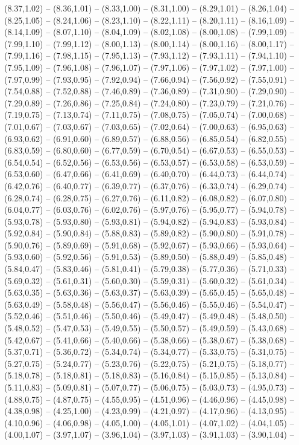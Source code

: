 {(8.37,1.02) -- (8.36,1.01) -- (8.33,1.00) -- (8.31,1.00) -- (8.29,1.01) -- (8.26,1.04) -- (8.25,1.05) -- (8.24,1.06) -- (8.23,1.10) -- (8.22,1.11) -- (8.20,1.11) -- (8.16,1.09) -- (8.14,1.09) -- (8.07,1.10) -- (8.04,1.09) -- (8.02,1.08) -- (8.00,1.08) -- (7.99,1.09) -- (7.99,1.10) -- (7.99,1.12) -- (8.00,1.13) -- (8.00,1.14) -- (8.00,1.16) -- (8.00,1.17) -- (7.99,1.16) -- (7.98,1.15) -- (7.95,1.13) -- (7.93,1.12) -- (7.93,1.11) -- (7.94,1.10) -- (7.95,1.09) -- (7.96,1.08) -- (7.96,1.07) -- (7.97,1.06) -- (7.97,1.02) -- (7.97,1.00) -- (7.97,0.99) -- (7.93,0.95) -- (7.92,0.94) -- (7.66,0.94) -- (7.56,0.92) -- (7.55,0.91) -- (7.54,0.88) -- (7.52,0.88) -- (7.46,0.89) -- (7.36,0.89) -- (7.31,0.90) -- (7.29,0.90) -- (7.29,0.89) -- (7.26,0.86) -- (7.25,0.84) -- (7.24,0.80) -- (7.23,0.79) -- (7.21,0.76) -- (7.19,0.75) -- (7.13,0.74) -- (7.11,0.75) -- (7.08,0.75) -- (7.05,0.74) -- (7.00,0.68) -- (7.01,0.67) -- (7.03,0.67) -- (7.03,0.65) -- (7.02,0.64) -- (7.00,0.63) -- (6.95,0.63) -- (6.93,0.62) -- (6.91,0.60) -- (6.89,0.57) -- (6.88,0.56) -- (6.85,0.54) -- (6.82,0.55) -- (6.83,0.59) -- (6.80,0.60) -- (6.77,0.59) -- (6.70,0.54) -- (6.67,0.53) -- (6.55,0.53) -- (6.54,0.54) -- (6.52,0.56) -- (6.53,0.56) -- (6.53,0.57) -- (6.53,0.58) -- (6.53,0.59) -- (6.53,0.60) -- (6.47,0.66) -- (6.41,0.69) -- (6.40,0.70) -- (6.44,0.73) -- (6.44,0.74) -- (6.42,0.76) -- (6.40,0.77) -- (6.39,0.77) -- (6.37,0.76) -- (6.33,0.74) -- (6.29,0.74) -- (6.28,0.74) -- (6.28,0.75) -- (6.27,0.76) -- (6.11,0.82) -- (6.08,0.82) -- (6.07,0.80) -- (6.04,0.77) -- (6.03,0.76) -- (6.02,0.76) -- (5.97,0.76) -- (5.95,0.77) -- (5.94,0.78) -- (5.93,0.78) -- (5.93,0.80) -- (5.93,0.81) -- (5.94,0.82) -- (5.94,0.83) -- (5.93,0.84) -- (5.92,0.84) -- (5.90,0.84) -- (5.88,0.83) -- (5.89,0.82) -- (5.90,0.80) -- (5.91,0.78) -- (5.90,0.76) -- (5.89,0.69) -- (5.91,0.68) -- (5.92,0.67) -- (5.93,0.66) -- (5.93,0.64) -- (5.93,0.60) -- (5.92,0.56) -- (5.91,0.53) -- (5.89,0.50) -- (5.88,0.49) -- (5.85,0.48) -- (5.84,0.47) -- (5.83,0.46) -- (5.81,0.41) -- (5.79,0.38) -- (5.77,0.36) -- (5.71,0.33) -- (5.69,0.32) -- (5.61,0.31) -- (5.60,0.30) -- (5.59,0.31) -- (5.60,0.32) -- (5.61,0.34) -- (5.63,0.35) -- (5.63,0.36) -- (5.63,0.37) -- (5.63,0.39) -- (5.65,0.45) -- (5.65,0.48) -- (5.63,0.49) -- (5.58,0.48) -- (5.56,0.47) -- (5.56,0.46) -- (5.55,0.46) -- (5.54,0.47) -- (5.52,0.46) -- (5.51,0.46) -- (5.50,0.46) -- (5.49,0.47) -- (5.49,0.48) -- (5.48,0.50) -- (5.48,0.52) -- (5.47,0.53) -- (5.49,0.55) -- (5.50,0.57) -- (5.49,0.59) -- (5.43,0.68) -- (5.42,0.67) -- (5.41,0.66) -- (5.40,0.66) -- (5.38,0.66) -- (5.38,0.67) -- (5.38,0.68) -- (5.37,0.71) -- (5.36,0.72) -- (5.34,0.74) -- (5.34,0.77) -- (5.33,0.75) -- (5.31,0.75) -- (5.27,0.75) -- (5.24,0.77) -- (5.23,0.76) -- (5.22,0.75) -- (5.21,0.75) -- (5.18,0.77) -- (5.18,0.78) -- (5.18,0.81) -- (5.18,0.83) -- (5.16,0.84) -- (5.15,0.85) -- (5.13,0.84) -- (5.11,0.83) -- (5.09,0.81) -- (5.07,0.77) -- (5.06,0.75) -- (5.03,0.73) -- (4.95,0.73) -- (4.88,0.75) -- (4.87,0.75) -- (4.55,0.95) -- (4.51,0.96) -- (4.46,0.96) -- (4.45,0.98) -- (4.38,0.98) -- (4.25,1.00) -- (4.23,0.99) -- (4.21,0.97) -- (4.17,0.96) -- (4.13,0.95) -- (4.10,0.96) -- (4.06,0.98) -- (4.05,1.00) -- (4.05,1.01) -- (4.07,1.02) -- (4.04,1.05) -- (4.00,1.07) -- (3.97,1.07) -- (3.96,1.04) -- (3.97,1.03) -- (3.91,1.03) -- (3.90,1.04) -- }
